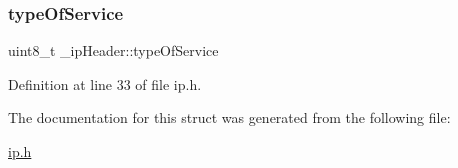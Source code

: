 \subsubsection{\texorpdfstring{type\+Of\+Service}{typeOfService}}
{\footnotesize\ttfamily uint8\+\_\+t \+\_\+ip\+Header\+::type\+Of\+Service}



Definition at line 33 of file ip.\+h.



The documentation for this struct was generated from the following file\+:\begin{DoxyCompactItemize}
\item 
\hyperlink{ip_8h}{ip.\+h}\end{DoxyCompactItemize}

